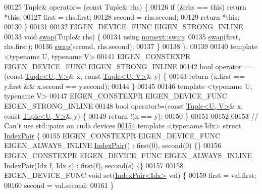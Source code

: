 \begin{DoxyCode}
00125   Tuple& operator= (\textcolor{keyword}{const} Tuple& rhs) \{
00126     \textcolor{keywordflow}{if} (&rhs == \textcolor{keyword}{this}) \textcolor{keywordflow}{return} *\textcolor{keyword}{this};
00127     first = rhs.first;
00128     second = rhs.second;
00129     \textcolor{keywordflow}{return} *\textcolor{keyword}{this};
00130   \}
00131 
00132   EIGEN\_DEVICE\_FUNC EIGEN\_STRONG\_INLINE
00133   \textcolor{keywordtype}{void} \hyperlink{endian_8c_a3ca5ecd34b04d6a243c054ac3a57f68d}{swap}(Tuple& rhs) \{
00134     \textcolor{keyword}{using} \hyperlink{endian_8c_a3ca5ecd34b04d6a243c054ac3a57f68d}{numext::swap};
00135     \hyperlink{endian_8c_a3ca5ecd34b04d6a243c054ac3a57f68d}{swap}(first, rhs.first);
00136     \hyperlink{endian_8c_a3ca5ecd34b04d6a243c054ac3a57f68d}{swap}(second, rhs.second);
00137   \}
00138 \};
00139 
00140 \textcolor{keyword}{template} <\textcolor{keyword}{typename} U, \textcolor{keyword}{typename} V>
00141 EIGEN\_CONSTEXPR EIGEN\_DEVICE\_FUNC EIGEN\_STRONG\_INLINE
00142 \textcolor{keywordtype}{bool} operator==(\textcolor{keyword}{const} \hyperlink{struct_eigen_1_1_tuple}{Tuple<U, V>}& x, \textcolor{keyword}{const} \hyperlink{struct_eigen_1_1_tuple}{Tuple<U, V>}& y) \{
00143   \textcolor{keywordflow}{return} (x.first == y.first && x.second == y.second);
00144 \}
00145 
00146 \textcolor{keyword}{template} <\textcolor{keyword}{typename} U, \textcolor{keyword}{typename} V>
00147 EIGEN\_CONSTEXPR EIGEN\_DEVICE\_FUNC EIGEN\_STRONG\_INLINE
00148 \textcolor{keywordtype}{bool} operator!=(\textcolor{keyword}{const} \hyperlink{struct_eigen_1_1_tuple}{Tuple<U, V>}& x, \textcolor{keyword}{const} \hyperlink{struct_eigen_1_1_tuple}{Tuple<U, V>}& y) \{
00149   \textcolor{keywordflow}{return} !(x == y);
00150 \}
00151 
00152 
00153 \textcolor{comment}{// Can't use std::pairs on cuda devices}
\hyperlink{struct_eigen_1_1_index_pair}{00154} \textcolor{keyword}{template} <\textcolor{keyword}{typename} Idx> \textcolor{keyword}{struct }\hyperlink{struct_eigen_1_1_index_pair}{IndexPair} \{
00155   EIGEN\_CONSTEXPR EIGEN\_DEVICE\_FUNC EIGEN\_ALWAYS\_INLINE \hyperlink{struct_eigen_1_1_index_pair}{IndexPair}() : first(0), second(0) \{\}
00156   EIGEN\_CONSTEXPR EIGEN\_DEVICE\_FUNC EIGEN\_ALWAYS\_INLINE IndexPair(Idx f, Idx s) : first(f), second(s) \{\}
00157 
00158   EIGEN\_DEVICE\_FUNC \textcolor{keywordtype}{void} \textcolor{keyword}{set}(\hyperlink{struct_eigen_1_1_index_pair}{IndexPair<Idx>} val) \{
00159     first = val.first;
00160     second = val.second;
00161   \}

\end{DoxyCode}
